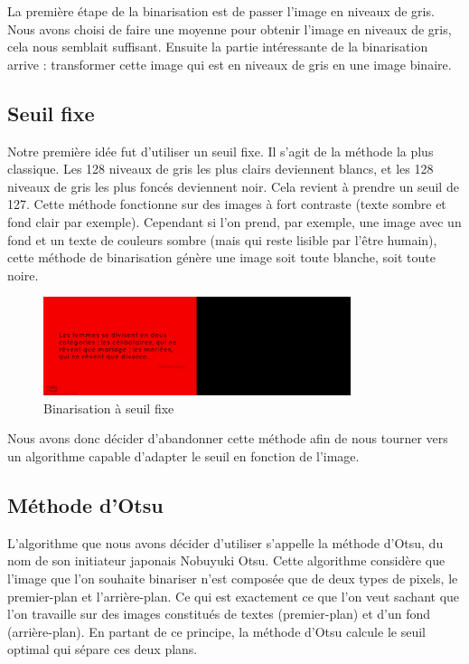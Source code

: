 \documentclass[11pt]{report}
\begin{document}
La première étape de la binarisation est de passer l’image en niveaux de gris. Nous avons choisi de faire une moyenne pour obtenir l’image en niveaux de gris, cela nous semblait suffisant. Ensuite la partie intéressante de la binarisation arrive : transformer cette image qui est en niveaux de gris en une image binaire.

\subsection{Seuil fixe}

Notre première idée fut d'utiliser un seuil fixe. Il s'agit de la méthode la plus classique. Les 128 niveaux de gris les plus clairs deviennent blancs, et les 128 niveaux de gris les plus foncés deviennent noir. Cela revient à prendre un seuil de 127. Cette méthode fonctionne sur des images à fort contraste (texte sombre et fond clair par exemple). Cependant si l'on prend, par exemple, une image avec un fond et un texte de couleurs sombre (mais qui reste lisible par l’être humain), cette méthode de binarisation génère une image soit toute blanche, soit toute noire.

\begin{figure}[htbp]
\centering
\includegraphics[width=9cm]{b_fixed.png}
\caption{Binarisation à seuil fixe}
\end{figure}

Nous avons donc décider d'abandonner cette méthode afin de nous tourner vers un algorithme capable d'adapter le seuil en fonction de l'image.

\subsection{Méthode d'Otsu}

L'algorithme que nous avons décider d'utiliser s'appelle la méthode d'Otsu, du nom de son initiateur japonais Nobuyuki Otsu. Cette algorithme considère que l’image que l’on souhaite binariser n’est composée que de deux types de pixels, le premier-plan et l’arrière-plan. Ce qui est exactement ce que l’on veut sachant que l’on travaille sur des images constitués de textes (premier-plan) et d’un fond (arrière-plan). En partant de ce principe, la méthode d'Otsu calcule le seuil optimal qui sépare ces deux plans.
\end{document}
